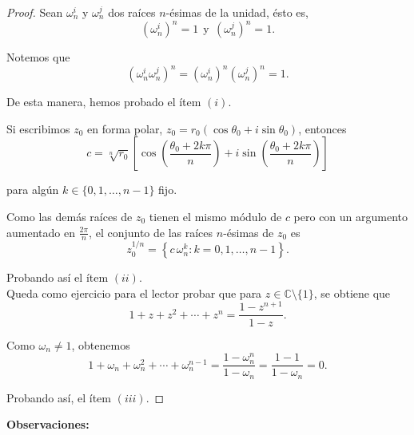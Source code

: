 \begin{proof}
Sean $\omega_n^i$ y $\omega_n^j$ dos raíces $n$-ésimas de la unidad, ésto es,
$$(\omega_n^i)^n = 1 ~~\mbox{y}~~ (\omega_n^j)^n = 1.$$

Notemos que
$$(\omega_n^i \omega_n^j)^n = (\omega_n^i)^n (\omega_n^j)^n = 1. $$

De esta manera, hemos probado el ítem $(i)$.

Si escribimos $z_0$ en forma polar, $z_0 =  r_0 (\cos \theta_0 + i \sin\theta_0)$, entonces
$$c = \sqrt[n]{r_0} \left[ \cos \left( \frac{\theta_0 + 2k\pi}{n} \right) + i \sin \left( \frac{\theta_0 + 2k\pi}{n} \right)\right] $$

para algún $k \in \{0,1,\dots,n-1\}$ fijo.

Como las demás raíces de $z_0$ tienen el mismo módulo de $c$ pero con un argumento aumentado en $\frac{2\pi}{n}$, el conjunto de las raíces $n$-ésimas de $z_0$ es  
$$z_0^{1/n} = \left\{ c \, \omega_n^k : k = 0, 1, \dots, n-1 \right\}.$$

Probando así el ítem $(ii)$.
\\

Queda como ejercicio para el lector probar que para $z \in \mathbb{C} \setminus\{1\}$, se obtiene que 
$$1 + z + z^2 + \cdots + z^n = \frac{1 -z^{n+1}}{1 - z}.$$

Como $\omega_n \neq 1$, obtenemos
$$1 + \omega_n + \omega_n^2 + \cdots + \omega_n^{n-1} = \frac{1 -  \omega_n^n}{1 - \omega_n} = \frac{1-1}{1-\omega_n} = 0.$$

Probando así, el ítem $(iii)$.

\end{proof}

\textbf{Observaciones:}

